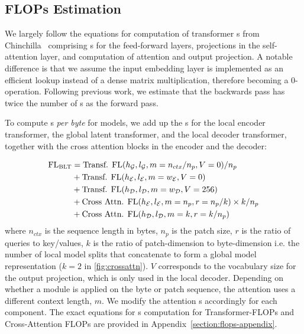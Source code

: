 \documentclass[]{fairmeta}
\begin{document}
\subsection{FLOPs Estimation} 
\label{section:flops}

We largely follow the equations for computation of transformer \flop{}s from Chinchilla~\citep{hoffmann2022training} comprising \flop{}s for the feed-forward layers,  projections in the self-attention layer, and computation of attention and output projection.
A notable difference is that we assume the input embedding layer is implemented as an efficient lookup instead of a dense matrix multiplication, therefore becoming a 0-\flop{} operation.
Following previous work, we estimate that the backwards pass has twice the number of \flop{}s as the forward pass.

To compute \flop{}s \textit{per byte} for \model{} models, we add up the \flop{}s for the local encoder transformer, the global latent transformer, and the local decoder transformer, together with the cross attention blocks in the encoder and the decoder:

\begin{align}
    \text{FL}_{\text{{\textsc BLT}{}}} &= \text{Transf. FL}(h_{\mathcal{G}}, l_{\mathcal{G}}, m=n_{ctx}/n_p,V=0) / n_p\\
   &+\text{Transf. FL}(h_{\mathcal{E}}, l_{\mathcal{E}}, m=w_{\mathcal{E}}, V=0) \\
   &+ \text{Transf. FL}(h_{\mathcal{D}}, l_{\mathcal{D}}, m=w_{\mathcal{D}}, V=256) \\ 
    &+ \text{Cross Attn. FL}(h_{\mathcal{E}}, l_{\mathcal{E}}, m=n_p, r=n_p/k) \times k/n_p \\ 
   &+ \text{Cross Attn. FL}(h_{\mathcal{D}}, l_{\mathcal{D}}, m=k, r=k/n_p) 
\end{align}
where $n_{ctx}$ is the sequence length in bytes, $n_p$ is the patch size, $r$ is the ratio of queries to key/values, $k$ is the ratio of patch-dimension to byte-dimension i.e. the number of local model splits that concatenate to form a global model representation ($k=2$ in \autoref{fig:crossattn}). $V$ corresponds to the vocabulary size for the output projection, which is only used in the local decoder.
Depending on whether a module is applied on the byte or patch sequence, the attention uses a different context length, $m$. We modify the attention \flop{}s accordingly for each component.
The exact equations for \flop{}s computation for Transformer-FLOPs and Cross-Attention FLOPs are provided in Appendix~\ref{section:flops-appendix}.
\end{document}
